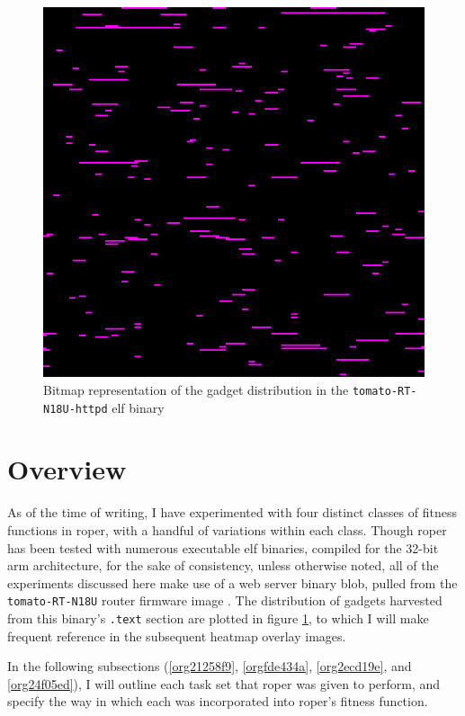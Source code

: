 \documentclass[12pt,glossary]{dalthesis}
\begin{document}
\begin{figure}[htbp]
\centering
\includegraphics[width=.9\linewidth]{../images/tomato-RT-N18U-httpd_heatmap.png}
\caption{\label{fig:org51794cc}
Bitmap representation of the gadget distribution in the \texttt{tomato-RT-N18U-httpd} \gls{elf} binary}
\end{figure}

\section{Overview}
\label{sec:org3ce8b64}
\label{org1b49dfd}

As of the time of writing, I have experimented with four distinct classes of
fitness functions in \gls{roper}, with a handful of variations within each class.
Though \gls{roper} has been tested with numerous executable \gls{elf} binaries,
compiled for the 32-bit \gls{arm} architecture, for the sake of consistency, 
unless otherwise noted, all of the experiments discussed here make use of
a web server binary blob, pulled from the \texttt{tomato-RT-N18U} router firmware
image \cite{tomato-RT-N18U}. The distribution of gadgets harvested from this
binary's \texttt{.text} section are plotted in figure \ref{fig:org51794cc}, to which
I will make frequent reference in the subsequent heatmap overlay images.

In the following subsections (\ref{org21258f9}, \ref{orgfde434a},
\ref{org2ecd19e}, and \ref{org24f05ed}), I will outline each task set that
\gls{roper} was given to perform, and specify the way in which each was
incorporated into \gls{roper}'s fitness function.
\end{document}

